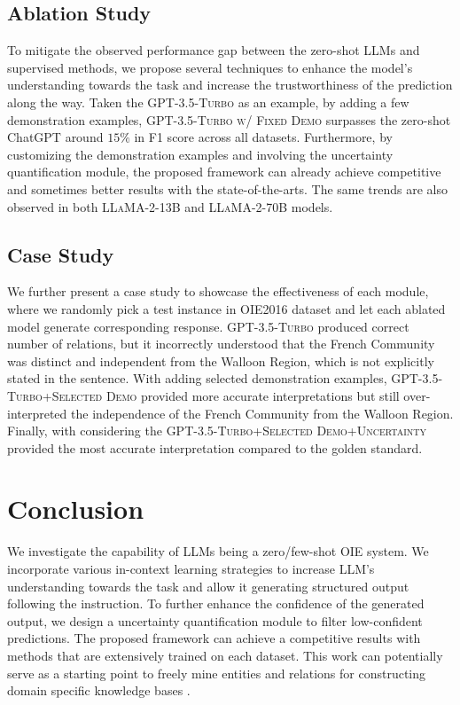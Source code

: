\documentclass{article}
\begin{document}
\subsection{Ablation Study}
To mitigate the observed performance gap between the zero-shot LLMs and supervised methods, we propose several techniques to enhance the model's understanding towards the task and increase the trustworthiness of the prediction along the way. Taken the \textsc{GPT-3.5-Turbo} as an example, by adding a few demonstration examples, \textsc{GPT-3.5-Turbo w/ Fixed Demo} surpasses the zero-shot ChatGPT around $15\%$ in F1 score across all datasets. Furthermore, by customizing the demonstration examples and involving the uncertainty quantification module, the proposed framework can already achieve competitive and sometimes better results with the state-of-the-arts. The same trends are also observed in both \textsc{LLaMA-2-13B} and \textsc{LLaMA-2-70B} models.

\subsection{Case Study}
We further present a case study to showcase the effectiveness of each module, where we randomly pick a test instance in OIE2016 dataset and let each ablated model generate corresponding response. \textsc{GPT-3.5-Turbo} produced correct number of relations, but it incorrectly understood that the French Community was distinct and independent from the Walloon Region, which is not explicitly stated in the sentence. With adding selected demonstration examples, \textsc{GPT-3.5-Turbo+Selected Demo} provided more accurate interpretations but still over-interpreted the independence of the French Community from the Walloon Region. Finally, with considering the \textsc{GPT-3.5-Turbo+Selected Demo+Uncertainty} provided the most accurate interpretation compared to the golden standard.

\section{Conclusion}
We investigate the capability of LLMs being a zero/few-shot OIE system. We incorporate various in-context learning strategies to increase LLM's understanding towards the task and allow it generating structured output following the instruction. To further enhance the confidence of the generated output, we design a uncertainty quantification module to filter low-confident predictions. The proposed framework can achieve a competitive results with methods that are extensively trained on each dataset. This work can potentially serve as a starting point to freely mine entities and relations for constructing domain specific knowledge bases \cite{cui2023survey}.



\end{document}
